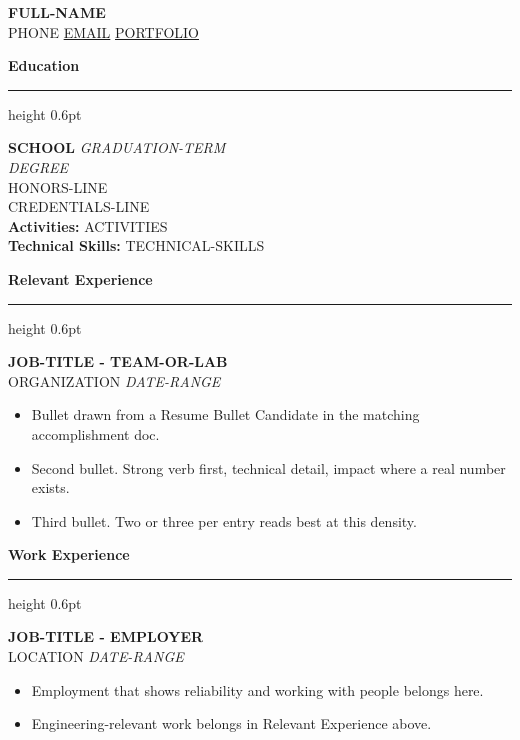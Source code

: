 \documentclass[11pt,letterpaper]{article}
\newcommand{\sectionheader}[1]{%
  \vspace{6pt}%
  {\fontsize{12}{14}\selectfont\bfseries #1}\par
  \vspace{1pt}\hrule height 0.6pt\vspace{4pt}%
}
\newcommand{\entry}[3]{%
  \vspace{5pt}%
  \textbf{#1}\\
  #2 \hfill \textit{#3}%
}
\begin{document}
\begin{center}
  {\fontsize{18}{22}\selectfont\bfseries {{FULL-NAME}}}\\[4pt]
  {{PHONE}} \quad\textbar\quad \href{mailto:{{EMAIL}}}{{{EMAIL}}} \quad\textbar\quad \href{https://{{PORTFOLIO}}}{{{PORTFOLIO}}}
\end{center}

\sectionheader{Education}
\textbf{{{SCHOOL}}} \hfill \textit{{{GRADUATION-TERM}}}\\
\textit{{{DEGREE}}}\\
{{HONORS-LINE}}\\
{{CREDENTIALS-LINE}}\\
\textbf{Activities:} {{ACTIVITIES}}\\
\textbf{Technical Skills:} {{TECHNICAL-SKILLS}}

\sectionheader{Relevant Experience}

\entry{{{JOB-TITLE}} - {{TEAM-OR-LAB}}}%
{{{ORGANIZATION}}}{{{DATE-RANGE}}}
\begin{itemize}
  \item Bullet drawn from a Resume Bullet Candidate in the matching accomplishment doc.
  \item Second bullet. Strong verb first, technical detail, impact where a real number exists.
  \item Third bullet. Two or three per entry reads best at this density.
\end{itemize}

\sectionheader{Work Experience}

\entry{{{JOB-TITLE}} - {{EMPLOYER}}}%
{{{LOCATION}}}{{{DATE-RANGE}}}
\begin{itemize}
  \item Employment that shows reliability and working with people belongs here.
  \item Engineering-relevant work belongs in Relevant Experience above.
\end{itemize}
\end{document}
